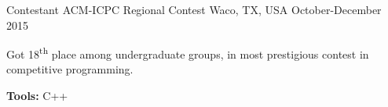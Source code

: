 \begin{cventries}
{\begin{cvitems}
      \end{cvitems}
    }
    \cventry
  	{Contestant}
    {ACM-ICPC Regional Contest}
    {Waco, TX, USA}
    {October-December 2015}
    {
      \begin{cvitems}
        \item {Got 18\textsuperscript{th} place among undergraduate groups, in most prestigious contest in competitive programming.}
        \item {\textbf{Tools:} C++}
      \end{cvitems}
    }
\end{cventries}
